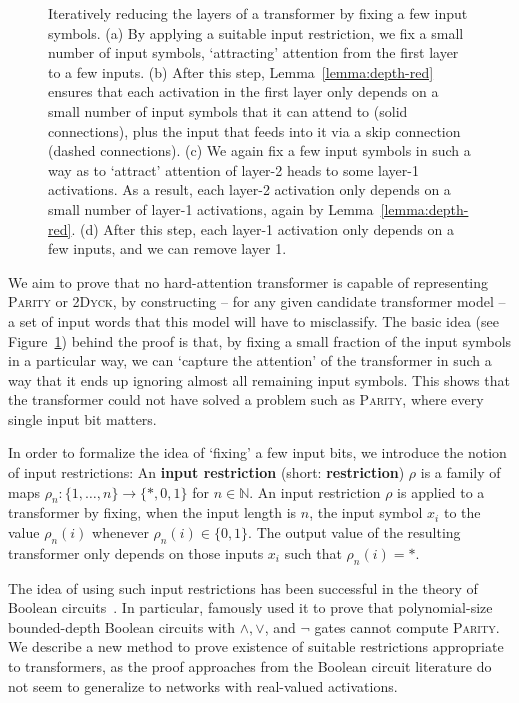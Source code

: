 \documentclass[11pt,a4paper]{article}
\newcommand{\key}[1]{\textbf{#1}}
\begin{document}
\begin{figure}[ht]
\begin{tabular}{cccc}
        \end{tabular}
	\caption{Iteratively reducing the layers of a transformer by fixing a few input symbols. (a) By applying a suitable input restriction, we fix a small number of input symbols, `attracting' attention from the first layer to a few inputs. (b) After this step, Lemma~\ref{lemma:depth-red} ensures that each activation in the first layer only depends on a small number of input symbols that it can attend to (solid connections), plus the input that feeds into it via a skip connection (dashed connections). (c) We again fix a few input symbols in such a way as to `attract' attention of layer-2 heads to some layer-1 activations. As a result, each layer-2 activation only depends on a small number of layer-1 activations, again by Lemma~\ref{lemma:depth-red}. (d) After this step, each layer-1 activation only depends on a few inputs, and we can remove layer 1.
	}
	\label{fig:depth-reduction}
\end{figure}

We aim to prove that no hard-attention transformer is capable of representing \textsc{Parity} or \textsc{2Dyck}, by constructing -- for any given candidate transformer model -- a set of input words that this model will have to misclassify.
The basic idea (see Figure~\ref{fig:depth-reduction}) behind the proof is that, by fixing a small fraction of the input symbols in a particular way, we can `capture the attention' of the transformer in such a way that it ends up ignoring almost all remaining input symbols.
This shows that the transformer could not have solved a problem such as \textsc{Parity}, where every single input bit matters.



In order to formalize the idea of `fixing'  a few input bits, we introduce the notion of input restrictions:
An \key{input restriction} (short: \key{restriction}) $\rho$ is a family of maps $\rho_n : \{1, \dots, n\} \rightarrow \{*, 0, 1\}$ for $n \in \mathbb{N}$.
An input restriction $\rho$ is applied to a transformer by fixing, when the input length is $n$, the input symbol $x_i$ to the value $\rho_n(i)$ whenever $\rho_n(i) \in \{0, 1\}$.
The output value of the resulting transformer only depends on those inputs $x_i$ such that $\rho_n(i) = *$.

The idea of using such input restrictions has been successful in the theory of Boolean circuits~\cite{furst1984parity,hastad1994optimal}.
In particular, \citet{furst1984parity}  famously used it to prove that polynomial-size bounded-depth Boolean circuits with $\wedge, \vee$, and $\neg$ gates cannot compute \textsc{Parity}.
We describe a new method to prove existence of suitable restrictions appropriate to transformers, as the proof approaches from the Boolean circuit literature do not seem to generalize to networks with real-valued activations.
\end{document}
